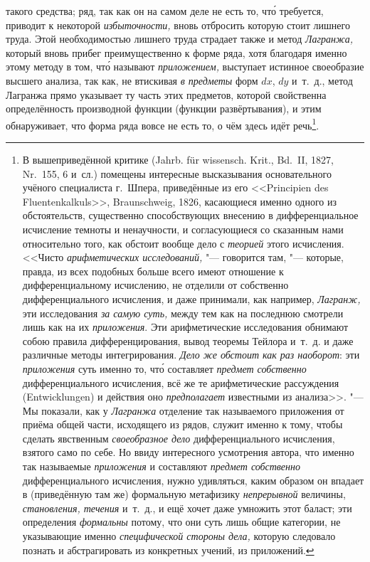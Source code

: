 такого средства; ряд, так как он на самом деле не есть то, чт\'{о} требуется,
приводит к некоторой {\em избыточности,} вновь отбросить которую стоит лишнего
труда. Этой необходимостью лишнего труда страдает также и метод {\em Лагранжа,}
который вновь прибег преимущественно к форме ряда, хотя благодаря именно этому
методу в том, чт\'{о} называют {\em приложением,} выступает истинное своеобразие
высшего анализа, так как, не втискивая {\em в предметы} форм $dx$, $dy$
и~т.~д., метод Лагранжа прямо указывает ту часть этих предметов, которой
свойственна определённость производной функции (функции развёртывания), и этим
обнаруживает, что форма ряда вовсе не есть то, о чём здесь идёт речь\footnote{В
вышеприведённой критике (Jahrb. für wissensch. Krit., Bd.~II, 1827, Nr.~155, 6
и~сл.) помещены интересные высказывания основательного учёного специалиста
г.~Шпера, приведённые из его <<Prin\-ci\-pien des Flu\-enten\-kal\-kuls>>,
Braun\-schweig, 1826, касающиеся именно одного из обстоятельств, существенно
способствующих внесению в дифференциальное исчисление темноты и ненаучности, и
согласующиеся со сказанным нами относительно того, как обстоит вообще дело с
{\em теорией} этого исчисления. <<Чисто {\em арифметических исследований,} "---
говорится там, "--- которые, правда, из всех подобных больше всего имеют
отношение к дифференциальному исчислению, не отделили от собственно
дифференциального исчисления, и даже принимали, как например, {\em Лагранж,}
эти исследования {\em за самую суть,} между тем как на последнюю смотрели лишь
как на их {\em приложения}. Эти арифметические исследования обнимают собою
правила дифференцирования, вывод теоремы Тейлора и~т.~д. и даже различные
методы интегрирования. {\em Дело же обстоит как раз наоборот}: эти
{\em приложения} суть именно то, чт\'{о} составляет {\em предмет собственно}
дифференциального исчисления, всё же те арифметические рассуждения
(Ent\-wick\-lungen) и действия оно {\em предполагает} известными из анализа>>.
"--- Мы показали, как у {\em Лагранжа} отделение так называемого приложения от
приёма общей части, исходящего из рядов, служит именно к тому, чтобы сделать
явственным {\em своеобразное дело} дифференциального исчисления, взятого само
по себе. Но ввиду интересного усмотрения автора, что именно так называемые
{\em приложения} и составляют {\em предмет собственно} дифференциального
исчисления, нужно удивляться, каким образом он впадает в (приведённую там же)
формальную метафизику {\em непрерывной} величины, {\em становления, течения}
и~т.~д., и ещё хочет даже умножить этот баласт; эти определения {\em формальны}
потому, что они суть лишь общие категории, не указывающие именно
{\em специфической стороны дела,} которую следовало познать и абстрагировать
из конкретных учений, из приложений.}.

